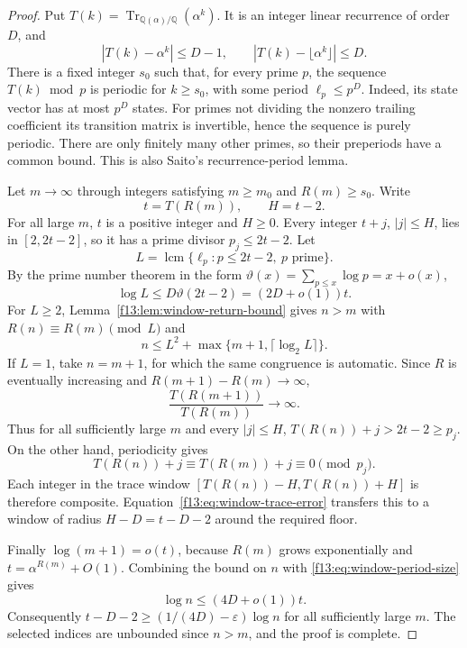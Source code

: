 \documentclass[11pt,a4paper]{article}
\theoremstyle{definition}
\theoremstyle{remark}
\numberwithin{equation}{section}
\begin{document}
\begin{proof}
Put $T(k)=\operatorname{Tr}_{\mathbb Q(\alpha)/\mathbb Q}(\alpha^k)$.
It is an integer linear recurrence of order $D$, and
\begin{equation}\label{f13:eq:window-trace-error}
 |T(k)-\alpha^k|\le D-1,\qquad
 |T(k)-\lfloor\alpha^k\rfloor|\le D.
\end{equation}
There is a fixed integer $s_0$ such that, for every prime $p$, the
sequence $T(k)\bmod p$ is periodic for $k\ge s_0$, with some period
$\ell_p\le p^D$.  Indeed, its state vector has at most $p^D$ states.
For primes not dividing the nonzero trailing coefficient its transition
matrix is invertible, hence the sequence is purely periodic.  There are
only finitely many other primes, so their preperiods have a common
bound.  This is also Saito's recurrence-period lemma.

Let $m\to\infty$ through integers satisfying $m\ge m_0$ and
$R(m)\ge s_0$.  Write
\[
 t=T(R(m)),\qquad H=t-2.
\]
For all large $m$, $t$ is a positive integer and $H\ge0$.  Every integer
$t+j$, $|j|\le H$, lies in $[2,2t-2]$, so it has a prime divisor
$p_j\le2t-2$.  Let
\[
 L=\operatorname{lcm}\{\ell_p:p\le2t-2,\ p\text{ prime}\}.
\]
By the prime number theorem in the form
$\vartheta(x)=\sum_{p\le x}\log p=x+o(x)$,
\begin{equation}\label{f13:eq:window-period-size}
 \log L\le D\vartheta(2t-2)=(2D+o(1))t.
\end{equation}
For $L\ge2$, Lemma~\ref{f13:lem:window-return-bound} gives $n>m$ with
$R(n)\equiv R(m)\pmod L$ and
\[
 n\le L^2+\max\{m+1,\lceil\log_2L\rceil\}.
\]
If $L=1$, take $n=m+1$, for which the same congruence is automatic.
Since $R$ is eventually increasing and $R(m+1)-R(m)\to\infty$,
\[
 \frac{T(R(m+1))}{T(R(m))}\longrightarrow\infty.
\]
Thus for all sufficiently large $m$ and every $|j|\le H$,
$T(R(n))+j>2t-2\ge p_j$.  On the other hand, periodicity gives
\[
 T(R(n))+j\equiv T(R(m))+j\equiv0\pmod{p_j}.
\]
Each integer in the trace window $[T(R(n))-H,T(R(n))+H]$ is therefore
composite.  Equation~\eqref{f13:eq:window-trace-error} transfers this to a
window of radius $H-D=t-D-2$ around the required floor.

Finally $\log(m+1)=o(t)$, because $R(m)$ grows exponentially and
$t=\alpha^{R(m)}+O(1)$.  Combining the bound on $n$ with
\eqref{f13:eq:window-period-size} gives
\[
 \log n\le(4D+o(1))t.
\]
Consequently $t-D-2\ge(1/(4D)-\varepsilon)\log n$ for all sufficiently
large $m$.  The selected indices are unbounded since $n>m$, and the
proof is complete.
\end{proof}
\end{document}
